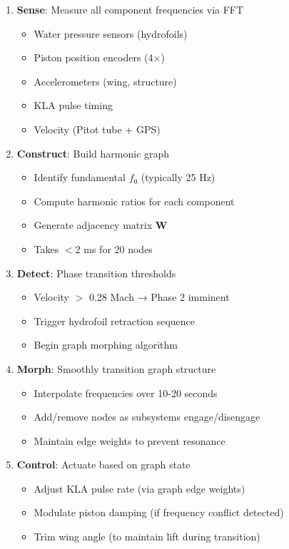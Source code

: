 \documentclass[12pt,a4paper]{article}
\begin{document}
\begin{enumerate}
\item \textbf{Sense}: Measure all component frequencies via FFT
  \begin{itemize}
  \item Water pressure sensors (hydrofoils)
  \item Piston position encoders (4×)
  \item Accelerometers (wing, structure)
  \item KLA pulse timing
  \item Velocity (Pitot tube + GPS)
  \end{itemize}

\item \textbf{Construct}: Build harmonic graph
  \begin{itemize}
  \item Identify fundamental $f_0$ (typically 25 Hz)
  \item Compute harmonic ratios for each component
  \item Generate adjacency matrix $\mathbf{W}$
  \item Takes $<$2 ms for 20 nodes
  \end{itemize}

\item \textbf{Detect}: Phase transition thresholds
  \begin{itemize}
  \item Velocity $>$ 0.28 Mach → Phase 2 imminent
  \item Trigger hydrofoil retraction sequence
  \item Begin graph morphing algorithm
  \end{itemize}

\item \textbf{Morph}: Smoothly transition graph structure
  \begin{itemize}
  \item Interpolate frequencies over 10-20 seconds
  \item Add/remove nodes as subsystems engage/disengage
  \item Maintain edge weights to prevent resonance
  \end{itemize}

\item \textbf{Control}: Actuate based on graph state
  \begin{itemize}
  \item Adjust KLA pulse rate (via graph edge weights)
  \item Modulate piston damping (if frequency conflict detected)
  \item Trim wing angle (to maintain lift during transition)
  \end{itemize}
\end{enumerate}
\end{document}
